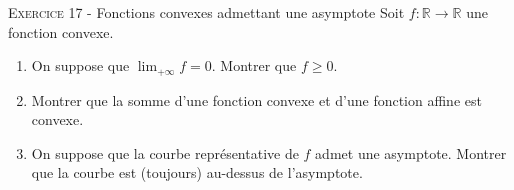 

\vskip0.3cm\noindent\textsc{Exercice 17} - Fonctions convexes admettant une asymptote
\vskip0.2cm
Soit $f:\mathbb R\to\mathbb R$ une fonction convexe. 
\begin{enumerate}
\item On suppose que $\lim_{+\infty}f=0$. Montrer que $f\geq 0$.
\item Montrer que la somme d'une fonction convexe et d'une fonction affine est convexe.
\item On suppose que la courbe représentative de $f$ admet une asymptote. Montrer que la courbe est (toujours) au-dessus
de l'asymptote.
\end{enumerate}




\vskip0.5cm



\DeclareMathOperator{\ch}{ch}
\DeclareMathOperator{\sh}{sh}
\DeclareMathOperator{\vect}{vect}
\DeclareMathOperator{\card}{card}
\DeclareMathOperator{\comat}{comat}
\DeclareMathOperator{\imv}{Im}
\DeclareMathOperator{\rang}{rg}
\DeclareMathOperator{\Fr}{Fr}
\DeclareMathOperator{\diam}{diam}
\DeclareMathOperator{\supp}{supp}